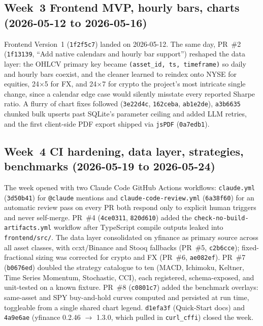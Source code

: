 \subsection*{Week~3 \textemdash{} Frontend MVP, hourly bars, charts (2026-05-12 to 2026-05-16)}

Frontend Version~1 (\texttt{1f2f5c7}) landed on 2026-05-12. The same day, PR~\#2
(\texttt{1f13139}, ``Add native calendars and hourly bar support'') reshaped the
data layer: the OHLCV primary key became \texttt{(asset\_id, ts, timeframe)} so
daily and hourly bars coexist, and the cleaner learned to reindex onto NYSE for
equities, 24$\times$5 for FX, and 24$\times$7 for crypto \textemdash{} the
project's most intricate single change, since a calendar edge case would silently
misstate every reported Sharpe ratio. A flurry of
chart fixes followed (\texttt{3e22d4c}, \texttt{162ceba}, \texttt{ab1e2de}),
\texttt{a3b6635} chunked bulk upserts past SQLite's parameter ceiling and added
LLM retries, and the first client-side PDF export shipped via \texttt{jsPDF}
(\texttt{0a7edb1}).

\subsection*{Week~4 \textemdash{} CI hardening, data layer, strategies, benchmarks (2026-05-19 to 2026-05-24)}

The week opened with two Claude Code GitHub Actions workflows:
\texttt{claude.yml} (\texttt{3d50b41}) for \texttt{@claude} mentions and
\texttt{claude-code-review.yml} (\texttt{6a38f60}) for an automatic review pass
on every PR \textemdash{} both respond only to explicit human triggers and never
self-merge. PR~\#4 (\texttt{4ce0311}, \texttt{820d610}) added the
\texttt{check-no-build-artifacts.yml} workflow after TypeScript compile outputs
leaked into \texttt{frontend/src/}. The data layer consolidated on yfinance as
primary source across all asset classes, with ccxt/Binance and Stooq fallbacks
(PR~\#5, \texttt{c2b6cce}); fixed-fractional sizing was corrected for crypto and
FX (PR~\#6, \texttt{ae082ef}). PR~\#7 (\texttt{b0676ed}) doubled the strategy
catalogue to ten (MACD, Ichimoku, Keltner, Time Series Momentum, Stochastic,
CCI), each registered, schema-exposed, and unit-tested on a known fixture.
PR~\#8 (\texttt{c0801c7}) added the
benchmark overlays: same-asset and SPY buy-and-hold curves computed and persisted
at run time, toggleable from a single shared chart legend. \texttt{d1efa3f}
(Quick-Start docs) and \texttt{4a9e6ae} (yfinance 0.2.46 $\to$ 1.3.0, which
pulled in \texttt{curl\_cffi}) closed the week.

